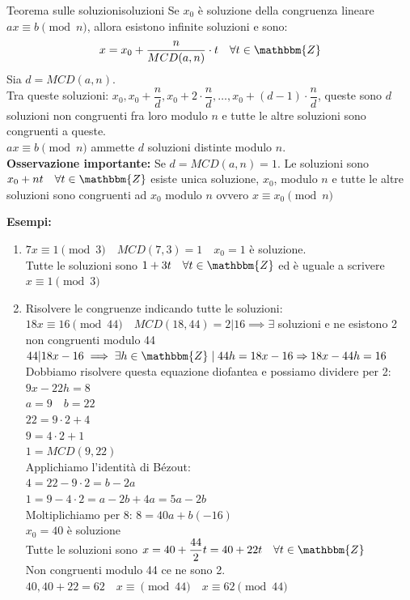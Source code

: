 \documentclass[12pt, letterpaper]{report}
\newcounter{theorem}
\newcommand{\nmu}{}
\begin{document}
		\begin{theorem}{\nmu Teorema sulle soluzioni}{soluzioni}
			Se $x_0$ è soluzione della congruenza lineare $ax \equiv b \pmod{n}$, allora esistono infinite soluzioni e sono:
			\[
			x=x_0 + \dfrac{n}{MCD(a,n)} \cdot t \quad \forall t \in \mathbbm{Z}
			\]
			Sia $d = MCD(a,n)$. \\
			Tra queste soluzioni: $x_0, x_0 + \dfrac{n}{d}, x_0 + 2 \cdot \dfrac{n}{d}, \dots, x_0 + (d - 1) \cdot \dfrac{n}{d}$, queste sono $d$ soluzioni non congruenti fra loro modulo $n$ e tutte le altre soluzioni sono congruenti a queste. \\
			$ax \equiv b \pmod{n}$ ammette $d$ soluzioni distinte modulo $n$. \\
			\textbf{Osservazione importante:} Se $d=MCD(a,n)=1$. Le soluzioni sono $x_0 + nt \quad \forall t \in \mathbbm{Z}$ esiste unica soluzione, $x_0$, modulo $n$ e tutte le altre soluzioni sono congruenti ad $x_0$ modulo $n$ ovvero $x \equiv x_0 \pmod{n}$
		\end{theorem}
		\textbf{Esempi:}
		\begin{enumerate}
			\item $7x \equiv 1 \pmod{3} \quad MCD(7,3) = 1 \quad x_0 = 1$ è soluzione. \\
			Tutte le soluzioni sono $1 + 3t \quad \forall t \in \mathbbm{Z}$ ed è uguale a scrivere $x \equiv 1 \pmod{3}$
			\item Risolvere le congruenze indicando tutte le soluzioni: \\
			$18x \equiv 16 \pmod{44} \quad MCD(18,44) = 2 | 16 \implies \exists$ soluzioni e ne esistono 2 non congruenti modulo 44 \\
			$44|18x - 16 \implies \exists h \in \mathbbm{Z} \mid 44h = 18x - 16 \Rightarrow 18x - 44h = 16$ \\
			Dobbiamo risolvere questa equazione diofantea e possiamo dividere per 2: \\
			$9x - 22h = 8$ \\
			$a=9 \quad b=22$ \\
			$22 = 9 \cdot 2 + 4$ \\
			$9 = 4 \cdot 2 + 1$ \\
			$1 = MCD(9, 22)$ \\
			Applichiamo l'identità di Bézout: \\
			$4 = 22 - 9 \cdot 2 = b - 2a$ \\
			$1 = 9 - 4\cdot 2 = a - 2b + 4a = 5a - 2b$ \\
			Moltiplichiamo per 8: $8 = 40a + b(-16)$ \\
			$x_0 = 40$ è soluzione \\
			Tutte le soluzioni sono $x=40 + \dfrac{44}{2}t = 40 + 22t \quad \forall t \in \mathbbm{Z}$ \\
			Non congruenti modulo 44 ce ne sono 2. \\
			$40, 40+22=62 \quad x \equiv \pmod{44} \quad x\equiv 62 \pmod{44}$
		\end{enumerate}
\end{document}
